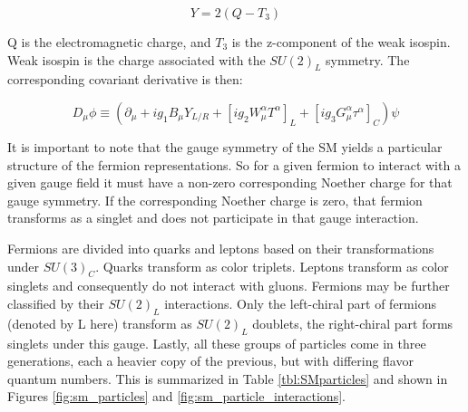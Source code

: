 \begin{equation}
Y= 2(Q-T_{3})
\end{equation}

Q is the electromagnetic charge, and $ T_{3}$ is the z-component of the weak isospin. Weak isospin is the charge associated with the $SU(2)_{L}$ symmetry. The corresponding covariant derivative is then:

\begin{equation}
D_{\mu}\phi \equiv (\partial_{\mu} + ig_{1}B_{\mu}Y_{L/R} + [ig_{2}W^{\alpha}_{\mu}T^{\alpha}]_{L} + [ig_{3}G^{\alpha}_{\mu}\tau^{\alpha}]_{C})\psi
\end{equation}

It is important to note that the gauge symmetry of the SM yields a particular structure of the fermion representations. So for a given fermion to interact with a given gauge field it must have a non-zero corresponding Noether charge for that gauge symmetry. If the corresponding Noether charge is zero, that fermion transforms as a singlet and does not participate in that gauge interaction. 

Fermions are divided into quarks and leptons based on their transformations under $SU(3)_{C}$. Quarks transform as color triplets. Leptons transform as color singlets and consequently do not interact with gluons. 
Fermions may be further classified by their $SU(2)_{L}$ interactions. Only the left-chiral part of fermions (denoted by L here) transform as $SU(2)_{L}$ doublets, the right-chiral part forms singlets under this gauge. Lastly, all these groups of particles come in three generations, each a heavier copy of the previous, but with differing flavor quantum numbers. This is summarized in Table \ref{tbl:SMparticles} and shown in Figures \ref{fig:sm_particles} and \ref{fig:sm_particle_interactions}.

